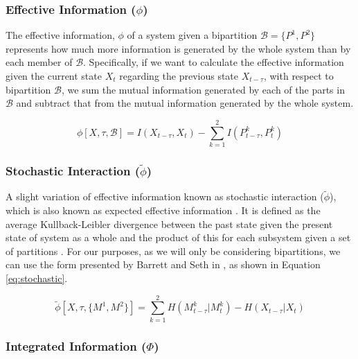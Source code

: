 \documentclass[a4paper,11pt]{article}
\begin{document}
\subsubsection{Effective Information ($\phi$)}
\label{EI}

The effective information, $\phi$ of a system given a bipartition $\mathcal{B} = \lbrace P^1, P^2 \rbrace$ represents how much more information is generated by the whole system than by each member of $\mathcal{B}$. Specifically, if we want to calculate the effective information given the current state $X_t$ regarding the previous state $X_{t - \tau}$, with respect to bipartition $\mathcal{B}$, we sum the mutual information generated by each of the parts in $\mathcal{B}$ and subtract that from the mutual information generated by the whole system.

\begin{equation} \label{eq:ei}
\phi [X, \tau, \mathcal{B}] = I(X_{t-\tau}, X_t) - \sum_{k=1}^{2} I(P_{t-\tau}^k, P_{t}^k)
\end{equation}

\subsubsection{Stochastic Interaction ($\tilde{\phi}$)}
\label{sec:bg:stochastic}

A slight variation of effective information known as stochastic interaction ($\tilde{\phi}$), which is also known as expected effective information \cite{Barrett2011}. It is defined as the average Kullback-Leibler divergence between the past state given the present state of system as a whole and the product of this for each subsystem given a set of partitions \cite{Ay2015}. For our purposes, as we will only be considering bipartitions, we can use the form presented by Barrett and Seth in \cite{Barrett2011}, as shown in Equation \ref{eq:stochastic}.

\begin{equation} \label{eq:stochastic}
\tilde{\phi} [X, \tau, \{M^1, M^2\}] = \sum_{k=1}^{2} H(M_{t-\tau}^k | M_{t}^k)  - H(X_{t-\tau} | X_t)
\end{equation}

\subsubsection{Integrated Information ($\Phi$)}
\label{II}
\end{document}
